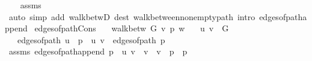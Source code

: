 \begin{isabellebody}
%
\isadelimproof
\ \ %
\endisadelimproof
%
\isatagproof
{}\isamarkupfalse%
\ assms\isanewline
\ \ \isamarkupfalse%
\ {\isacharparenleft}{\kern0pt}auto\ simp\ add{\isacharcolon}{\kern0pt}\ walk{\isacharunderscore}{\kern0pt}betwD{\isacharparenleft}{\kern0pt}{}{\isacharparenright}{\kern0pt}\ dest{\isacharcolon}{\kern0pt}\ walk{\isacharunderscore}{\kern0pt}between{\isacharunderscore}{\kern0pt}nonempty{\isacharunderscore}{\kern0pt}path{\isacharparenleft}{\kern0pt}{}{\isacharminus}{\kern0pt}{}{\isacharparenright}{\kern0pt}\ intro{\isacharcolon}{\kern0pt}\ edges{\isacharunderscore}{\kern0pt}of{\isacharunderscore}{\kern0pt}path{\isacharunderscore}{\kern0pt}append{\isacharunderscore}{\kern0pt}{}{\isacharparenright}{\kern0pt}%
\endisatagproof
{\isafoldproof}%
%
\isadelimproof
\isanewline
%
\endisadelimproof
%
\isadeliminvisible
\isanewline
%
\endisadeliminvisible
%
\isataginvisible
{}\isamarkupfalse%
\ edges{\isacharunderscore}{\kern0pt}of{\isacharunderscore}{\kern0pt}path{\isacharunderscore}{\kern0pt}Cons{\isacharcolon}{\kern0pt}\isanewline
\ \ \ {\isachardoublequoteopen}walk{\isacharunderscore}{\kern0pt}betw\ G\ v\ p\ w{\isachardoublequoteclose}\isanewline
\ \ \ {\isachardoublequoteopen}{\isacharbraceleft}{\kern0pt}u{\isacharcomma}{\kern0pt}\ v{\isacharbraceright}{\kern0pt}\ {\isasymin}\ G{\isachardoublequoteclose}\isanewline
\ \ \ {\isachardoublequoteopen}edges{\isacharunderscore}{\kern0pt}of{\isacharunderscore}{\kern0pt}path\ {\isacharparenleft}{\kern0pt}u\ {\isacharhash}{\kern0pt}\ p{\isacharparenright}{\kern0pt}\ {\isacharequal}{\kern0pt}\ {\isacharbraceleft}{\kern0pt}u{\isacharcomma}{\kern0pt}\ v{\isacharbraceright}{\kern0pt}\ {\isacharhash}{\kern0pt}\ edges{\isacharunderscore}{\kern0pt}of{\isacharunderscore}{\kern0pt}path\ p{\isachardoublequoteclose}%
\endisataginvisible
{\isafoldinvisible}%
%
\isadeliminvisible
\isanewline
%
\endisadeliminvisible
%
\isadelimproof
\ \ %
\endisadelimproof
%
\isatagproof
{}\isamarkupfalse%
\ assms\ edges{\isacharunderscore}{\kern0pt}of{\isacharunderscore}{\kern0pt}path{\isacharunderscore}{\kern0pt}append{\isacharbrackleft}{\kern0pt}\ {\isacharquery}{\kern0pt}p\ {\isacharequal}{\kern0pt}\ {\isachardoublequoteopen}{\isacharbrackleft}{\kern0pt}u{\isacharcomma}{\kern0pt}\ v{\isacharbrackright}{\kern0pt}{\isachardoublequoteclose}\ \ {\isacharquery}{\kern0pt}v\ {\isacharequal}{\kern0pt}\ v\ \ {\isacharquery}{\kern0pt}p{\isacharprime}{\kern0pt}\ {\isacharequal}{\kern0pt}\ p{\isacharbrackright}{\kern0pt}\isanewline

\end{isabellebody}
